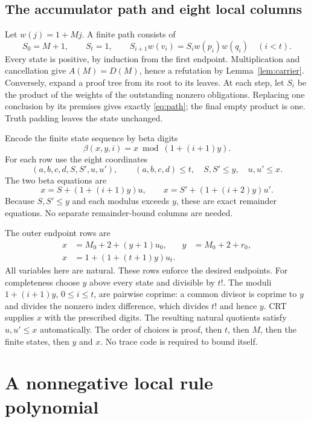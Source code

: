 \documentclass[10pt,letterpaper]{article}
\theoremstyle{definition}\newtheorem{definition}[theorem]{Definition}
\theoremstyle{remark}\newtheorem{remark}[theorem]{Remark}
\begin{document}
\subsection{The accumulator path and eight local columns}

Let $w(j)=1+Mj$. A finite path consists of
\begin{equation}\label{eq:path}
 S_0=M+1,\qquad S_t=1,\qquad
 S_{i+1}w(v_i)=S_iw(p_i)w(q_i)\quad(i<t).
\end{equation}
Every state is positive, by induction from the first endpoint.
Multiplication and cancellation give $A(M)=D(M)$, hence a refutation by
Lemma~\ref{lem:carrier}. Conversely, expand a proof tree from its root
to its leaves. At each step, let $S_i$ be the product of the weights of
the outstanding nonzero obligations. Replacing one conclusion by its
premises gives exactly \eqref{eq:path}; the final empty product is one.
Truth padding leaves the state unchanged.

Encode the finite state sequence by beta digits
\[
 \beta(x,y,i)=x\bmod (1+(i+1)y).
\]
For each row use the eight coordinates
\[
 (a,b,c,d,S,S',u,u'),\qquad
 (a,b,c,d)\le t,\quad S,S'\le y,\quad u,u'\le x.
\]
The two beta equations are
\begin{equation}\label{eq:beta}
 x=S+(1+(i+1)y)u,\qquad
 x=S'+(1+(i+2)y)u'.
\end{equation}
Because $S,S'\le y$ and each modulus exceeds $y$, these are exact
remainder equations. No separate remainder-bound columns are needed.

The outer endpoint rows are
\begin{align}
 x&=M_0+2+(y+1)u_0,& y&=M_0+2+r_0,\label{eq:initial}\\
 x&=1+(1+(t+1)y)u_t.\label{eq:final}
\end{align}
All variables here are natural. These rows enforce the desired endpoints.
For completeness choose $y$ above every state and divisible by $t!$.
The moduli $1+(i+1)y$, $0\le i\le t$, are pairwise coprime: a common
divisor is coprime to $y$ and divides the nonzero index difference, which
divides $t!$ and hence $y$. CRT supplies $x$ with the prescribed digits.
The resulting natural quotients satisfy $u,u'\le x$ automatically.
The order of choices is proof, then $t$, then $M$, then the finite states,
then $y$ and $x$. No trace code is required to bound itself.

\section{A nonnegative local rule polynomial}
\label{sec:local}
\end{document}
